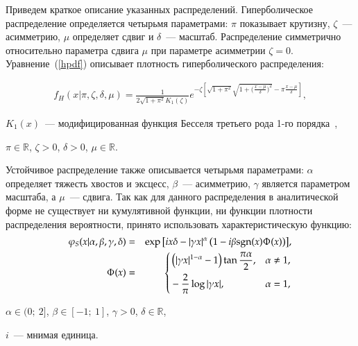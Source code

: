 Приведем краткое описание указанных распределений.
Гиперболическое распределение определяется четырьмя параметрами: $\pi$ показывает крутизну, $\zeta$~--- асимметрию, $\mu$ определяет сдвиг и $\delta$~--- масштаб. 
Распределение симметрично относительно параметра сдвига $\mu$ при параметре асимметрии $\zeta=0$. 
Уравнение~(\ref{hpdf}) описывает плотность гиперболического распределения:

\begin{eqnarray}\label{hpdf} 
f_H(x|\pi,\zeta,\delta,\mu)=\frac{1}{2 \sqrt{1+\pi^2} 
K_1(\zeta) }e^{-\zeta \left[ \sqrt{1+\pi^2}
\sqrt{1+\big(\frac{x-\mu}{\delta})^2}-
\pi\frac{x-\mu}{\delta}\right]},
\end{eqnarray}
\begin{where}
    \item $K_1(x)$~--- модифицированная функция Бесселя третьего рода 1-го порядка~\cite{Bessel1824}, 
    \item $\pi \in \mathbb{R}$, $\zeta > 0$, $\delta > 0$, $\mu \in \mathbb{R}$.
\end{where}

Устойчивое распределение также описывается четырьмя параметрами: $\alpha$ определяет тяжесть хвостов и эксцесс, $\beta$~--- асимметрию, $\gamma$ является параметром масштаба, а $\mu$~--- сдвига. Так как для данного распределения в аналитической форме не существует ни кумулятивной функции, ни функции плотности распределения вероятности, принято использовать характеристическую функцию:
%
\begin{eqnarray}\label{StChF} 
\varphi_S(x|\alpha,\beta,\gamma,\delta) &=& \exp{\left[ix\delta-|\gamma x|^\alpha \left(1 - i\beta\text{sgn}(x)\Upphi(x)\right)\right]}, \\
\Upphi(x) &=& \left\{ \begin{aligned}
    & \left(|\gamma x|^{1-\alpha} - 1\right)\tan{\frac{\pi\alpha}{2}}, & & \alpha \ne 1, \\
    & -\frac{2}{\pi}\log{|\gamma x|}, & & \alpha = 1,
\end{aligned} \right. \nonumber
\end{eqnarray}
\begin{where}
    \item $\alpha \in (0;\ 2]$, $\beta \in [-1;\ 1]$, $\gamma > 0$, $\delta \in \mathbb{R}$, 
    \item $i$~--- мнимая единица.
\end{where}

